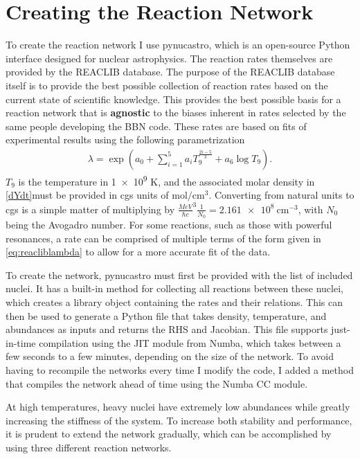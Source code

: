 \section{Creating the Reaction Network}
\label{sec:pna}
To create the reaction network I use pynucastro\cite{pynucastro2}, which is an open-source Python interface designed for nuclear astrophysics. The reaction rates themselves are provided by the REACLIB database\cite{REACLIB}. The purpose of the REACLIB database itself is to provide the best possible collection of reaction rates based on the current state of scientific knowledge. This provides the best possible basis for a reaction network that is \textbf{agnostic} to the biases inherent in rates selected by the same people developing the BBN code. These rates are based on fits of experimental results using the following parametrization 
\begin{align}
    \lambda = \exp\left(a_0+\sum_{i=1}^{5}a_i T_9^{\frac{2i-5}{3}}+a_6 \log{T_9}\right).
    \label{eq:reacliblambda}
\end{align}
$T_9$ is the temperature in \num{1e9} K, and the associated molar density in \cref{dYdt}must be provided in cgs units of $\text{mol}/\text{cm}^3$. Converting from natural units to cgs is a simple matter of multiplying by $\frac{MeV}{\hbar c}^3\frac{1}{N_0}=\SI{2.161e8}{\cm^{-3}}$, with $N_0$ being the Avogadro number. For some reactions, such as those with powerful resonances, a rate can be comprised of multiple terms of the form given in \cref{eq:reacliblambda} to allow for a more accurate fit of the data. 

To create the network, pynucastro must first be provided with the list of included nuclei. It has a built-in method for collecting all reactions between these nuclei, which creates a library object containing the rates and their relations. This can then be used to generate a Python file that takes density, temperature, and abundances as inputs and returns the RHS and Jacobian. This file supports just-in-time compilation using the JIT module from Numba, which takes between a few seconds to a few minutes, depending on the size of the network. To avoid having to recompile the networks every time I modify the code, I added a method that compiles the network ahead of time using the Numba CC module. 

At high temperatures, heavy nuclei have extremely low abundances while greatly increasing the stiffness of the system. To increase both stability and performance, it is prudent to extend the network gradually, which can be accomplished by using three different reaction networks. 

